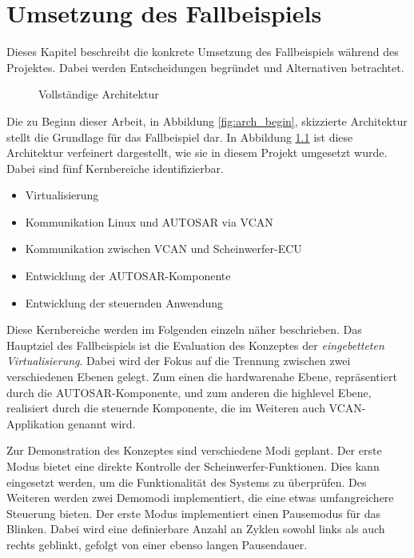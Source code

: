 \documentclass[
  a4paper,					    %
  twoside,
  DIV=calc,     				%
  bibliography=totoc,
  cleardoublepage=empty,
  ngerman,     					%
  final       					%
]{scrbook}
\begin{document}
\chapter{Umsetzung des Fallbeispiels}
\label{sec:Umsetzung_Fallbeispiel}
Dieses Kapitel beschreibt die konkrete Umsetzung des Fallbeispiels während des Projektes. Dabei werden Entscheidungen begründet und Alternativen betrachtet.

\begin{figure}[tb]
    \centering
    
    \caption{Vollständige Architektur}
    \label{fig:arch_finished}
\end{figure}

Die zu Beginn dieser Arbeit, in Abbildung \ref{fig:arch_begin}, skizzierte Architektur stellt die Grundlage für das Fallbeispiel dar. In Abbildung \ref{fig:arch_finished} ist diese Architektur verfeinert dargestellt, wie sie in diesem Projekt umgesetzt wurde. Dabei sind fünf Kernbereiche identifizierbar.

\begin{itemize}
    \item Virtualisierung
    \item Kommunikation Linux und AUTOSAR via VCAN
    \item Kommunikation zwischen VCAN und Scheinwerfer-ECU
    \item Entwicklung der AUTOSAR-Komponente
    \item Entwicklung der steuernden Anwendung
\end{itemize}

Diese Kernbereiche werden im Folgenden einzeln näher beschrieben. Das Hauptziel des Fallbeispiels ist die Evaluation des Konzeptes der \emph{eingebetteten Virtualisierung}. Dabei wird der Fokus auf die Trennung zwischen zwei verschiedenen Ebenen gelegt. Zum einen die hardwarenahe Ebene, repräsentiert durch die AUTOSAR-Komponente, und zum anderen die highlevel Ebene, realisiert durch die steuernde Komponente, die im Weiteren auch VCAN-Applikation genannt wird.

Zur Demonstration des Konzeptes sind verschiedene Modi geplant. Der erste Modus bietet eine direkte Kontrolle der Scheinwerfer-Funktionen. Dies kann eingesetzt werden, um die Funktionalität des Systems zu überprüfen. Des Weiteren werden zwei Demomodi implementiert, die eine etwas umfangreichere Steuerung bieten. Der erste Modus implementiert einen Pausemodus für das Blinken. Dabei wird eine definierbare Anzahl an Zyklen sowohl links als auch rechts geblinkt, gefolgt von einer ebenso langen Pausendauer.
\end{document}
